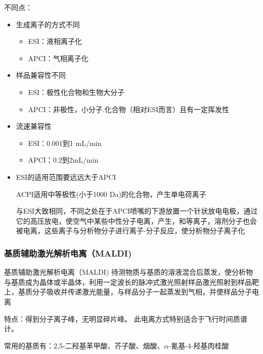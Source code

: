     不同点：
    \begin{itemize}
        \item 生成离子的方式不同
        \begin{itemize}
            \item ESI：液相离子化
            \item APCI：气相离子化
        \end{itemize}
        \item 样品兼容性不同
        \begin{itemize}
            \item ESI：极性化合物和生物大分子
            \item APCI：非极性，小分子.化合物（相对ESI而言）且有一定挥发性 
        \end{itemize}
        \item 流速兼容性
        \begin{itemize}
            \item ESI：0.001到1 mL/min
            \item APCI：0.2到2mL/min 
        \end{itemize}
        \item ESI的适用范围要远远大于APCI
        
        ACPI适用中等极性(小于1000 Da)的化合物，产生单电荷离子

        与ESI大致相同，不同之处在于APCI喷嘴的下游放置一个针状放电电极，通过它的高压放电，使空气中某些中性分子电离，产生，和等离子，溶剂分子也会被电离，这些离子与分析物分子进行离子-分子反应，使分析物分子离子化
    \end{itemize}
    \subsubsection*{ 基质辅助激光解析电离（MALDI)}
    \begin{definition*}{基质辅助激光解析电离（MALDI)}
        待测物质与基质的溶液混合后蒸发，使分析物与基质成为晶体或半晶体，利用一定波长的脉冲式激光照射样品激光照射到样品靶上，基质分子吸收并传递激光能量，与样品分子一起蒸发到气相，并使样品分子电离
    \end{definition*}
    
    特点：得到分子离子峰，无明显碎片峰。 此电离方式特别适合于飞行时间质谱计。
    \begin{note}
        常用的基质有：2,5-二羟基苯甲酸、芥子酸、烟酸、$\alpha$-氰基-4-羟基肉桂酸
    \end{note}


